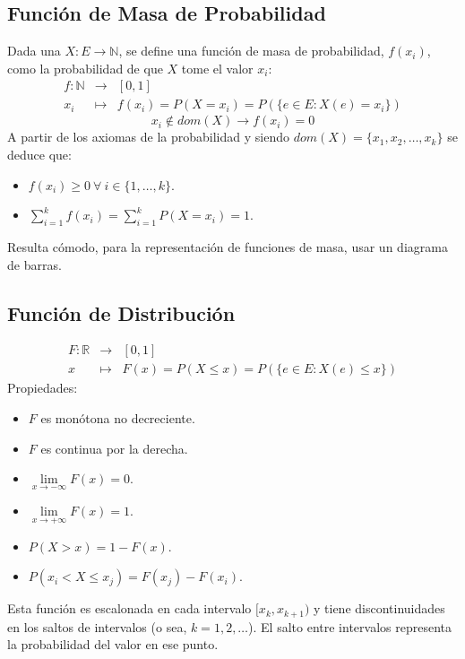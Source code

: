 \documentclass[10pt,a4paper]{book}
\begin{document}
\subsection{Función de Masa de Probabilidad}
Dada una $X : E\to\mathbb{N}$, se define una función de masa de probabilidad, $f(x_i)$, como la probabilidad de que $X$ tome el valor $x_i$:
\[\begin{array}{rcl}
	f:\mathbb{N} & \longrightarrow & [0,1]\\
	x_i & \longmapsto & f(x_i) = P(X = x_i) = P(\{e\in E : X(e) = x_i\})
\end{array}\]
\[x_i\notin dom(X) \longrightarrow f(x_i) = 0\]
A partir de los axiomas de la probabilidad y siendo $dom(X)=\{x_1, x_2, \dots,x_k\}$ se deduce que:
\begin{itemize}
	\item $f(x_i) \geq 0\:\forall\:i\in\{1,\dots,k\}$.
	\item $\sum\limits_{i=1}^k f(x_i) = \sum\limits_{i=1}^k P(X = x_i) = 1$.
\end{itemize}
Resulta cómodo, para la representación de funciones de masa, usar un diagrama de barras.

\subsection{Función de Distribución}
\[\begin{array}{rcl}
	F:\mathbb{R} & \longrightarrow & [0,1] \\
	x & \longmapsto & F(x) = P(X \leq x) =P(\{ e\in E : X(e)\leq x \})
\end{array}\]
Propiedades:
\begin{itemize}
	\item $F$ es monótona no decreciente.
	\item $F$ es continua por la derecha.
	\item $\lim\limits_{x\to -\infty}F(x)=0$.
	\item $\lim\limits_{x\to +\infty}F(x)=1$.
	\item $P(X>x) = 1-F(x)$.
	\item $P(x_i<X\leq x_j) = F(x_j)-F(x_i)$.
\end{itemize}
Esta función es escalonada en cada intervalo $[x_k, x_{k+1})$ y tiene discontinuidades en los saltos de intervalos (o sea, $k=1,2,\dots$). El salto entre intervalos representa la probabilidad del valor en ese punto.
\end{document}
